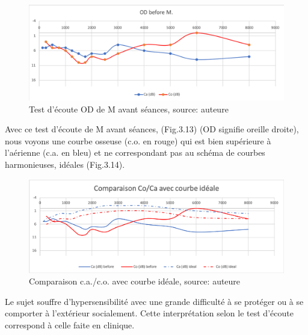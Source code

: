 \begin{figure}[tbh]
	\centering
	\includegraphics[width=0.7\linewidth]{images/clinique/od_before_m.png}
	\caption[Test d'écoute de M avant séances, OD]{Test d'écoute OD de M avant séances, source: 
	auteure}
	\label{fig:odbeforemeyer}
\end{figure}

Avec ce test d'écoute de M avant séances, (Fig.3.13) (OD signifie oreille droite), nous voyons une 
courbe osseuse (c.o. en rouge) qui est bien supérieure à l'aérienne (c.a. en bleu) et ne correspondant pas 
au schéma 
de courbes harmonieuses, idéales (Fig.3.14). 

	\begin{figure}[tbh]
	\centering
	\includegraphics[width=0.7\linewidth]{images/clinique/comparaison_ideal_avant.png}
	\caption[Comparaison avec la courbe idéale]{Comparaison c.a./c.o. avec courbe idéale, source: 
		auteure}
	\label{fig:comparisonbcbabeforevsidealcurvemeyer}
\end{figure}

Le sujet souffre d'hypersensibilité 
avec une 
grande 
difficulté à se protéger ou à se comporter à l'extérieur socialement. Cette interprétation selon le test 
d'écoute   
correspond à 
celle faite en clinique.



